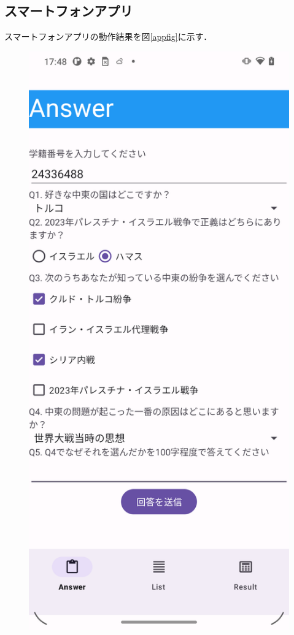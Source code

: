 \documentclass[titlepage,a4paper]{jsarticle}
\begin{document}
\subsection{スマートフォンアプリ}
スマートフォンアプリの動作結果を図\ref{appfig}に示す．
\begin{figure}[H]
  \centering
  \begin{minipage}[t]{0.40\textwidth}
    \centering
    \includegraphics[height=0.35\textheight]{img/move/app1.png}

\end{minipage}
\end{figure}
\end{document}
